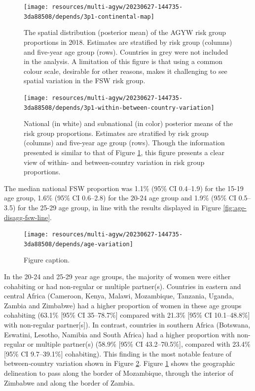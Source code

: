 \documentclass[a4paper, nobind]{templates/ociamthesis}
\begin{document}
\begin{figure}
\texttt{[image: resources/multi-agyw/20230627-144735-3da88508/depends/3p1-continental-map]} \caption{The spatial distribution (posterior mean) of the AGYW risk group proportions in 2018. Estimates are stratified by risk group (columns) and five-year age group (rows). Countries in grey were not included in the analysis. A limitation of this figure is that using a common colour scale, desirable for other reasons, makes it challenging to see spatial variation in the FSW risk group.}\label{fig:3p1-continental-map}
\end{figure}



\begin{figure}
\texttt{[image: resources/multi-agyw/20230627-144735-3da88508/depends/3p1-within-between-country-variation]} \caption{National (in white) and subnational (in color) posterior means of the risk group proportions. Estimates are stratified by risk group (columns) and five-year age group (rows). Though the information presented is similar to that of Figure \ref{fig:3p1-continental-map}, this figure presents a clear view of within- and between-country variation in risk group proportions.}\label{fig:3p1-within-between-country-variation}
\end{figure}

The median national FSW proportion was 1.1\% (95\% CI 0.4--1.9) for the 15-19 age group, 1.6\% (95\% CI 0.6--2.8) for the 20-24 age group and 1.9\% (95\% CI 0.5--3.5) for the 25-29 age group, in line with the results displayed in Figure \ref{fig:age-disagg-fsw-line}.



\begin{figure}
\texttt{[image: resources/multi-agyw/20230627-144735-3da88508/depends/age-variation]} \caption{Figure caption.}\label{fig:age-variation}
\end{figure}

In the 20-24 and 25-29 year age groups, the majority of women were either cohabiting or had non-regular or multiple partner(s).
Countries in eastern and central Africa (Cameroon, Kenya, Malawi, Mozambique, Tanzania, Uganda, Zambia and Zimbabwe) had a higher proportion of women in these age groups cohabiting (63.1\% {[}95\% CI 35--78.7\%{]} compared with 21.3\% {[}95\% CI 10.1--48.8\%{]} with non-regular partner{[}s{]}).
In contrast, countries in southern Africa (Botswana, Eswatini, Lesotho, Namibia and South Africa) had a higher proportion with non-regular or multiple partner(s) (58.9\% {[}95\% CI 43.2--70.5\%{]}, compared with 23.4\% {[}95\% CI 9.7--39.1\%{]} cohabiting).
This finding is the most notable feature of between-country variation shown in Figure \ref{fig:3p1-within-between-country-variation}.
Figure \ref{fig:3p1-continental-map} shows the geographic delineation to pass along the border of Mozambique, through the interior of Zimbabwe and along the border of Zambia.
\end{document}
